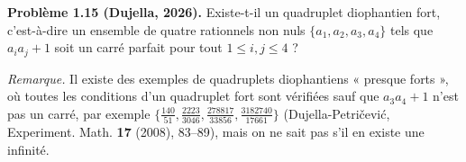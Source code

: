 \textbf{Problème 1.15 (Dujella, 2026).} Existe-t-il un quadruplet diophantien fort, c'est-à-dire un ensemble de quatre rationnels non nuls $\{a_1,a_2,a_3,a_4\}$ tels que $a_ia_j+1$ soit un carré parfait pour tout $1 \leqslant i,j \leqslant 4$ ?

\medskip

\textit{Remarque.} Il existe des exemples de quadruplets diophantiens « presque forts », où toutes les conditions d'un quadruplet fort sont vérifiées sauf que $a_3a_4+1$ n'est pas un carré, par exemple $\{\frac{140}{51}, \frac{2223}{3046}, \frac{278817}{33856}, \frac{3182740}{17661}\}$ (Dujella-Petričević, Experiment. Math. \textbf{17} (2008), 83--89), mais on ne sait pas s'il en existe une infinité.
